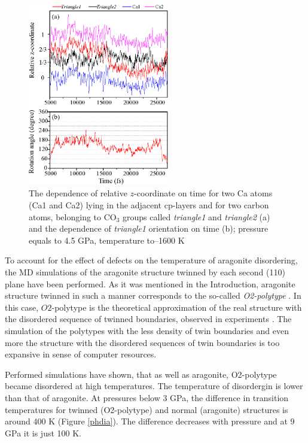 \documentclass[journal=jacsat,manuscript=article]{achemso}
\begin{document}
\begin{figure}[H]
\includegraphics[width=0.55\textwidth]{z_jump} \centering
\caption{The dependence of relative $z$-coordinate on time for two Ca atoms (Ca1 and Ca2) lying in the adjacent cp-layers and for two carbon atoms, belonging to CO$_3$ groups called {\it triangle1} and {\it triangle2} (a) and the dependence of {\it triangle1} orientation on time (b); pressure equals to 4.5 GPa, temperature to--1600 K} \label{z_jump}
\end{figure}



To account for the effect of defects on the temperature of aragonite disordering, the MD simulations of the aragonite structure twinned by each second (110) plane have been performed.
As it was mentioned in the Introduction, aragonite structure twinned in such a manner corresponds to the so-called {\it O2-polytype} \cite{gavr2019_arag}.
In this case, $O2$-polytype is the theoretical approximation of the real structure with the disordered sequence of twinned boundaries, observed in experiments \cite{gavr2019_arag}.
The simulation of the polytypes with the less density of twin boundaries and even more the structure with the disordered sequences of twin boundaries is too expansive in sense of computer resources.

Performed simulations have shown, that as well as aragonite, O2-polytype became disordered at high temperatures. 
The temperature of disordergin is lower than that of aragonite.
At pressures below 3 GPa, the difference in transition temperatures for twinned (O2-polytype) and normal (aragonite) structures is around 400 K (Figure \ref{phdia}). 
The difference decreases with pressure and at 9 GPa it is just 100 K.
\end{document}
